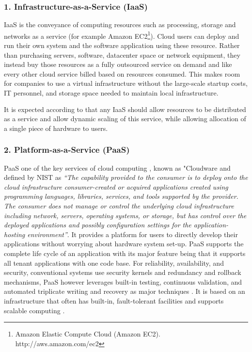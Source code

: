 

\subsubsection{1. Infrastructure-as-a-Service (IaaS)}
IaaS is the conveyance of computing resources such as processing, storage and networks as a service (for example Amazon EC2\footnote{Amazon Elastic Compute Cloud (Amazon EC2). http://aws.amazon.com/ec2}). Cloud users can deploy and run their own system and the software application using these resource. Rather than purchasing servers, software, datacenter space or network equipment, they instead buy those resources as a fully outsourced service on demand and like every other cloud service billed based on resources consumed\cite{kepes2010moving}. This makes room for companies to use a virtual infrastructure without the large-scale startup costs, IT personnel, and storage space needed to maintain local infrastructure.

It is expected according to \cite{kepes2011understanding} that any IaaS should allow resources to be distributed as a service and allow dynamic scaling of this service, while allowing allocation of a single piece of hardware to users.

\subsubsection{2. Platform-as-a-Service (PaaS)}
PaaS one of the key services of cloud computing \cite{khan2012cloud}, known as "Cloudware \cite{khan2012cloud} and defined by NIST as \textit{“The capability provided to the consumer is to deploy onto the cloud infrastructure consumer-created or acquired applications created using programming languages, libraries, services, and tools supported by the provider. The consumer does not manage or control the underlying cloud infrastructure including network, servers, operating systems, or storage, but has control over the deployed applications and possibly configuration settings for the application-hosting environment”}. It provides a platform for users to directly develop their applications without worrying about hardware system set-up. PaaS supports the complete life cycle of an application \cite{SITARAM201273} with its major feature being that it supports all tenant applications with one code base. For reliability, availability, and security, conventional systems use security kernels and redundancy and rollback mechanisms, PaaS however leverages built-in testing, continuous validation, and automated triplicate writing and recovery as major techniques \cite{khan2012cloud}. It is based on an infrastructure that often has built-in, fault-tolerant facilities and supports scalable computing \cite{wang2010cloud}.

